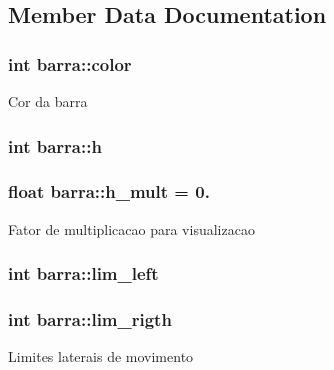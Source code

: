 \subsection{Member Data Documentation}
\subsubsection[{\texorpdfstring{color}{color}}]{\setlength{\rightskip}{0pt plus 5cm}int barra\+::color\hspace{0.3cm}{\ttfamily [private]}}\hypertarget{classbarra_a7234eb8aa0b635f9c1fb0456ebd7901c}{}\label{classbarra_a7234eb8aa0b635f9c1fb0456ebd7901c}
Cor da barra 
\subsubsection[{\texorpdfstring{h}{h}}]{\setlength{\rightskip}{0pt plus 5cm}int barra\+::h\hspace{0.3cm}{\ttfamily [private]}}\hypertarget{classbarra_add2a64a98c1781d1cc9b7b1f744df1a5}{}\label{classbarra_add2a64a98c1781d1cc9b7b1f744df1a5}
\subsubsection[{\texorpdfstring{h\+\_\+mult}{h_mult}}]{\setlength{\rightskip}{0pt plus 5cm}float barra\+::h\+\_\+mult = 0.\hspace{0.3cm}{\ttfamily [private]}}\hypertarget{classbarra_a6ee439263b66198984d59f0ef128e7a6}{}\label{classbarra_a6ee439263b66198984d59f0ef128e7a6}
Fator de multiplicacao para visualizacao 
\subsubsection[{\texorpdfstring{lim\+\_\+left}{lim_left}}]{\setlength{\rightskip}{0pt plus 5cm}int barra\+::lim\+\_\+left\hspace{0.3cm}{\ttfamily [private]}}\hypertarget{classbarra_af750951229deafd940b877200cfe8475}{}\label{classbarra_af750951229deafd940b877200cfe8475}
\subsubsection[{\texorpdfstring{lim\+\_\+rigth}{lim_rigth}}]{\setlength{\rightskip}{0pt plus 5cm}int barra\+::lim\+\_\+rigth\hspace{0.3cm}{\ttfamily [private]}}\hypertarget{classbarra_a5582b336cf268a203551806b0c1af495}{}\label{classbarra_a5582b336cf268a203551806b0c1af495}
Limites laterais de movimento 
